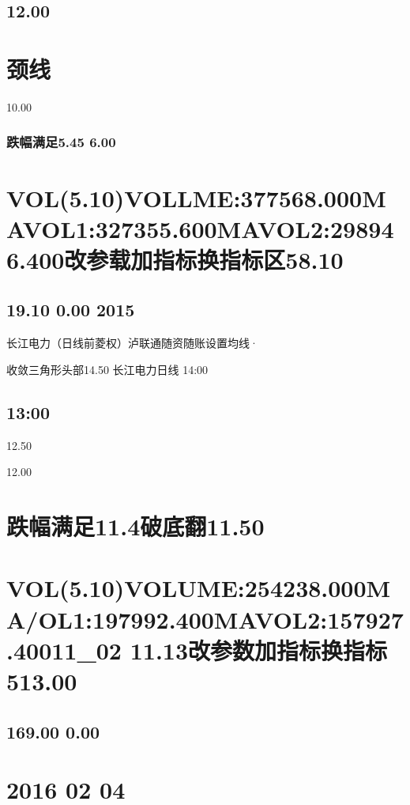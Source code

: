 \documentclass{article}
\begin{document}
\subsection{12.00}

\section{颈线}

10.00

\subsubsection{跌幅满足5.45 6.00}

\section{VOL(5.10)VOLLME:377568.000MAVOL1:327355.600MAVOL2:298946.400改参载加指标换指标区58.10}

\subsection{19.10 0.00 2015}

长江电力（日线前菱权）泸联通随资随账设置均线·

收敛三角形头部14.50 长江电力日线 14:00

\subsection{13:00}

12.50

12.00

\section{跌幅满足11.4破底翻11.50}

\section{VOL(5.10)VOLUME:254238.000MA/OL1:197992.400MAVOL2:157927.40011\_02 11.13改参数加指标换指标513.00}

\subsection{169.00 0.00}

\section{2016 02 04}
\end{document}
